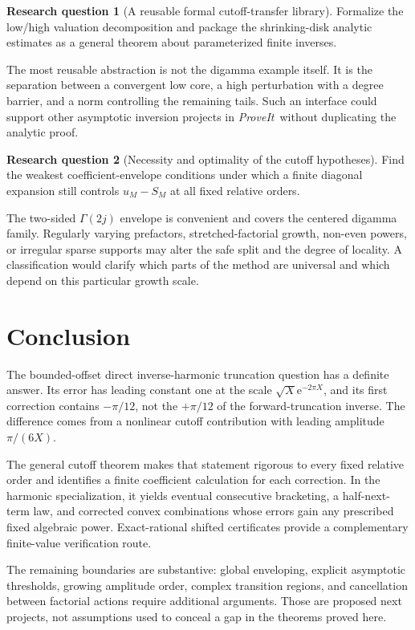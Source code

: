 \documentclass[11pt,a4paper]{article}
\theoremstyle{definition}
\newtheorem{problem}{Research question}
\numberwithin{equation}{section}
\newcommand{\e}{\mathrm e}
\newcommand{\repo}{\textit{ProveIt}}
\begin{document}
\begin{problem}[A reusable formal cutoff-transfer library]
Formalize the low/high valuation decomposition and package the shrinking-disk analytic estimates as a general theorem about parameterized finite inverses.
\end{problem}
The most reusable abstraction is not the digamma example itself. It is the separation between a convergent low core, a high perturbation with a degree barrier, and a norm controlling the remaining tails. Such an interface could support other asymptotic inversion projects in \repo\ without duplicating the analytic proof.

\begin{problem}[Necessity and optimality of the cutoff hypotheses]
Find the weakest coefficient-envelope conditions under which a finite diagonal expansion still controls $u_M-S_M$ at all fixed relative orders.
\end{problem}
The two-sided $\Gamma(2j)$ envelope is convenient and covers the centered digamma family. Regularly varying prefactors, stretched-factorial growth, non-even powers, or irregular sparse supports may alter the safe split and the degree of locality. A classification would clarify which parts of the method are universal and which depend on this particular growth scale.

\section{Conclusion}
\label{sec:conclusion}
The bounded-offset direct inverse-harmonic truncation question has a definite answer. Its error has leading constant one at the scale $\sqrt X\e^{-2\pi X}$, and its first correction contains $-\pi/12$, not the $+\pi/12$ of the forward-truncation inverse. The difference comes from a nonlinear cutoff contribution with leading amplitude $\pi/(6X)$.

The general cutoff theorem makes that statement rigorous to every fixed relative order and identifies a finite coefficient calculation for each correction. In the harmonic specialization, it yields eventual consecutive bracketing, a half-next-term law, and corrected convex combinations whose errors gain any prescribed fixed algebraic power. Exact-rational shifted certificates provide a complementary finite-value verification route.

The remaining boundaries are substantive: global enveloping, explicit asymptotic thresholds, growing amplitude order, complex transition regions, and cancellation between factorial actions require additional arguments. Those are proposed next projects, not assumptions used to conceal a gap in the theorems proved here.
\end{document}
